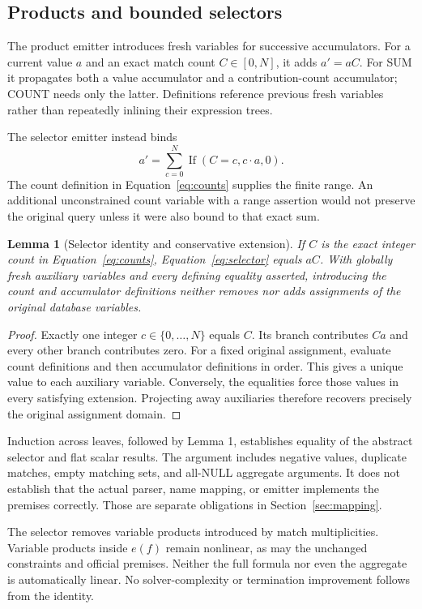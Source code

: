 \documentclass[3p,times,authoryear]{elsarticle}
\newtheorem{lemma}{Lemma}
\newcommand{\ite}{\operatorname{If}}
\begin{document}
\subsection{Products and bounded selectors}
The product emitter introduces fresh variables for successive accumulators. For a current value $a$ and an exact match count $C\in[0,N]$, it adds $a'=aC$. For SUM it propagates both a value accumulator and a contribution-count accumulator; COUNT needs only the latter. Definitions reference previous fresh variables rather than repeatedly inlining their expression trees.

The selector emitter instead binds
\begin{equation}
 a'=\sum_{c=0}^{N}\ite(C=c,c\cdot a,0).
 \label{eq:selector}
\end{equation}
The count definition in Equation~\eqref{eq:counts} supplies the finite range. An additional unconstrained count variable with a range assertion would not preserve the original query unless it were also bound to that exact sum.

\begin{lemma}[Selector identity and conservative extension]
If $C$ is the exact integer count in Equation~\eqref{eq:counts}, Equation~\eqref{eq:selector} equals $aC$. With globally fresh auxiliary variables and every defining equality asserted, introducing the count and accumulator definitions neither removes nor adds assignments of the original database variables.
\end{lemma}
\begin{proof}
Exactly one integer $c\in\{0,\ldots,N\}$ equals $C$. Its branch contributes $Ca$ and every other branch contributes zero. For a fixed original assignment, evaluate count definitions and then accumulator definitions in order. This gives a unique value to each auxiliary variable. Conversely, the equalities force those values in every satisfying extension. Projecting away auxiliaries therefore recovers precisely the original assignment domain.
\end{proof}

Induction across leaves, followed by Lemma 1, establishes equality of the abstract selector and flat scalar results. The argument includes negative values, duplicate matches, empty matching sets, and all-NULL aggregate arguments. It does not establish that the actual parser, name mapping, or emitter implements the premises correctly. Those are separate obligations in Section~\ref{sec:mapping}.

The selector removes variable products introduced by match multiplicities. Variable products inside $e(f)$ remain nonlinear, as may the unchanged constraints and official premises. Neither the full formula nor even the aggregate is automatically linear. No solver-complexity or termination improvement follows from the identity.
\end{document}
